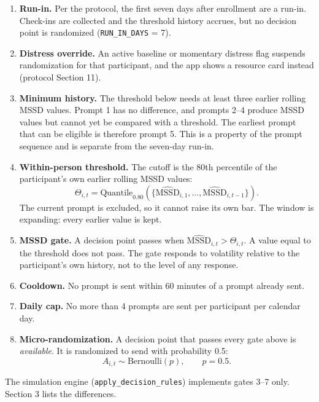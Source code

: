 \documentclass[11pt,letterpaper]{article}
\begin{document}
\begin{enumerate}
    \item \textbf{Run-in.} Per the protocol, the first seven days after enrollment are a run-in. Check-ins are collected and the threshold history accrues, but no decision point is randomized (\texttt{RUN\_IN\_DAYS} = 7).
    \item \textbf{Distress override.} An active baseline or momentary distress flag suspends randomization for that participant, and the app shows a resource card instead (protocol Section 11).
    \item \textbf{Minimum history.} The threshold below needs at least three earlier rolling MSSD values. Prompt 1 has no difference, and prompts 2--4 produce MSSD values but cannot yet be compared with a threshold. The earliest prompt that can be eligible is therefore prompt 5. This is a property of the prompt sequence and is separate from the seven-day run-in.
    \item \textbf{Within-person threshold.} The cutoff is the 80th percentile of the participant's own earlier rolling MSSD values:
    \begin{equation}
    \Theta_{i,t} = \text{Quantile}_{0.80}\left(\{\widehat{\text{MSSD}}_{i,1}, \dots, \widehat{\text{MSSD}}_{i,t-1}\}\right).
    \end{equation}
    The current prompt is excluded, so it cannot raise its own bar. The window is expanding: every earlier value is kept.
    \item \textbf{MSSD gate.} A decision point passes when $\widehat{\text{MSSD}}_{i,t} > \Theta_{i,t}$. A value equal to the threshold does not pass. The gate responds to volatility relative to the participant's own history, not to the level of any response.
    \item \textbf{Cooldown.} No prompt is sent within 60 minutes of a prompt already sent.
    \item \textbf{Daily cap.} No more than 4 prompts are sent per participant per calendar day.
    \item \textbf{Micro-randomization.} A decision point that passes every gate above is \emph{available}. It is randomized to send with probability 0.5:
    \begin{equation}
    A_{i,t} \sim \text{Bernoulli}(p), \qquad p = 0.5 .
    \end{equation}
\end{enumerate}

The simulation engine (\texttt{apply\_decision\_rules}) implements gates 3--7 only. Section 3 lists the differences.
\end{document}
